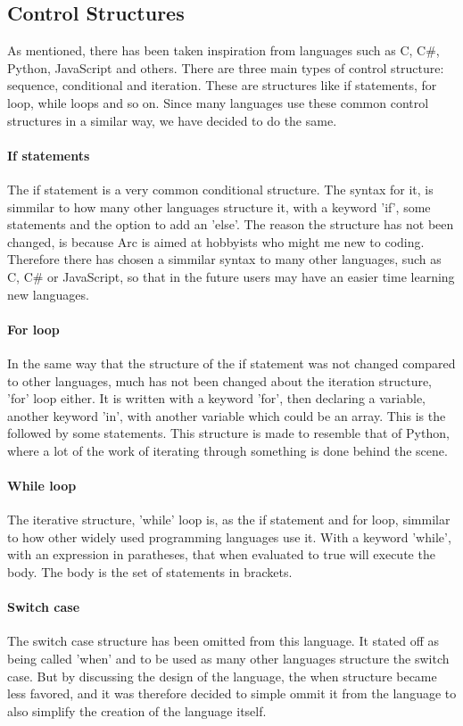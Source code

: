 \subsection{Control Structures}
As mentioned, there has been taken inspiration from languages such as C, C\#, Python, JavaScript and others. There are three main types of control structure: sequence, conditional and iteration. These are structures like if statements, for loop, while loops and so on. Since many languages use these common control structures in a similar way, we have decided to do the same.

\paragraph*{If statements}
The if statement is a very common conditional structure. The syntax for it, is simmilar to how many other languages structure it, with a keyword 'if', some statements and the option to add an 'else'. The reason the structure has not been changed, is because Arc is aimed at hobbyists who might me new to coding. Therefore there has chosen a simmilar syntax to many other languages, such as C, C\# or JavaScript, so that in the future users may have an easier time learning new languages.

\paragraph*{For loop}
In the same way that the structure of the if statement was not changed compared to other languages, much has not been changed about the iteration structure, 'for' loop either. It is written with a keyword 'for', then declaring a variable, another keyword 'in', with another variable which could be an array. This is the followed by some statements.
This structure is made to resemble that of Python, where a lot of the work of iterating through something is done behind the scene.

\paragraph*{While loop}
The iterative structure, 'while' loop is, as the if statement and for loop, simmilar to how other widely used programming languages use it. With a keyword 'while', with an expression in paratheses, that when evaluated to true will execute the body. The body is the set of statements in brackets. 

\paragraph*{Switch case}
The switch case structure has been omitted from this language. It stated off as being called 'when' and to be used as many other languages structure the switch case. But by discussing the design of the language, the when structure became less favored, and it was therefore decided to simple ommit it from the language to also simplify the creation of the language itself.
